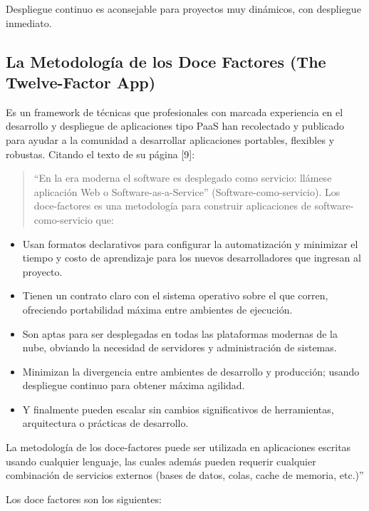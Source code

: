 \documentclass[conference]{IEEEtran}
\begin{document}
Despliegue continuo es aconsejable para proyectos muy dinámicos, con despliegue inmediato.

\subsection{La Metodología de los Doce Factores (The Twelve-Factor App)}

Es un framework de técnicas que profesionales con marcada experiencia en el desarrollo y despliegue de aplicaciones tipo PaaS han recolectado y publicado para ayudar a la comunidad a desarrollar aplicaciones portables, flexibles y robustas. Citando el texto de su página [9]:

\begin{quote}
 “En la era moderna el software es desplegado como servicio: llámese aplicación Web o Software-as-a-Service” (Software-como-servicio). Los doce-factores es una metodología para construir aplicaciones de software-como-servicio que:
\end{quote}

\begin{itemize}
 \item Usan formatos declarativos para configurar la automatización y minimizar el tiempo y costo de aprendizaje para los nuevos desarrolladores que ingresan al proyecto.
 \item Tienen un contrato claro con el sistema operativo sobre el que corren, ofreciendo portabilidad máxima entre ambientes de ejecución.
 \item Son aptas para ser desplegadas en todas las plataformas modernas de la nube, obviando la necesidad de servidores y administración de sistemas.
 \item Minimizan la divergencia entre ambientes de desarrollo y producción; usando despliegue continuo para obtener máxima agilidad.
 \item Y finalmente pueden escalar sin cambios significativos de herramientas, arquitectura o prácticas de desarrollo.
\end{itemize}

La metodología de los doce-factores puede ser utilizada en aplicaciones escritas usando cualquier lenguaje, las cuales además pueden requerir cualquier combinación de servicios externos (bases de datos, colas, cache de memoria, etc.)”

Los doce factores son los siguientes:
\end{document}

